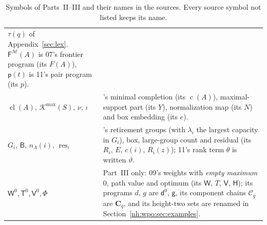 \documentclass[11pt,a4paper]{article}
\theoremstyle{definition}
\theoremstyle{remark}
\newcommand{\K}{\mathcal K}
\newcommand{\M}{\mathcal M}
\newcommand{\mcl}{\operatorname{cl}}
\newcommand{\Kmax}{\K^{\max}}
\newcommand{\Fdp}{\mathsf F}
\newcommand{\Wz}{\mathsf W^{0}}
\newcommand{\Tz}{\mathsf T^{0}}
\newcommand{\Vz}{\mathsf V^{0}}
\begin{document}
\begin{table}[htbp]
\begin{tabularx}{\linewidth}{@{}>{\raggedright\arraybackslash}p{.27\linewidth}>{\raggedright\arraybackslash}X@{}}
$\tau(q)$ of Appendix~\ref{sec:lex}. $\Fdp^{\M}(A)$ is 07's frontier program
(its $F(A)$), $\mathsf p(t)$ is 11's pair program (its $p$).\\
$\mcl(A)$, $\Kmax(S)$, $\nu$, $\iota$ & 07's minimal completion (its
$\operatorname{c}(A)$), maximal-support part (its $Y$), normalization map
(its $N$) and box embedding (its $e$).\\
$G_i$, $\mathsf B$, $n_\Lambda(i)$, $\operatorname{res}_i$ & 07's retirement
groups (with $\lambda_i$ the largest capacity in $G_i$), box, large-group
count and residual (its $R_i$, $E$, $c(i)$, $R_i(z)$); 11's rank term
$\theta$ is written $\vartheta$.\\
$\Wz,\Tz,\Vz,\Phi$ & Part~III only: 09's weights with \emph{empty maximum
$0$}, path value and optimum (its $\mathsf W$, $T$, $\mathsf V$,
$\mathsf H$); its programs $d$, $g$ are $\mathsf d^0$, $\mathsf g$, its
component chains $\mathscr C_q$ are $\mathbf C_q$, and its height-two sets
are renamed in Section~\ref{nh:wpo:sec:examples}.\\
\bottomrule
\end{tabularx}
\caption{Symbols of Parts~II--III and their names in the sources. Every
source symbol not listed keeps its name.}
\label{nh:tab:notation}
\end{table}
\end{document}
